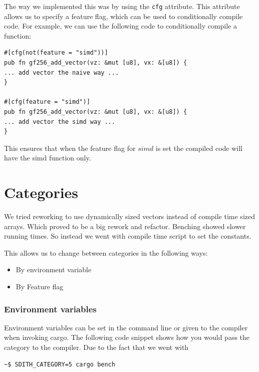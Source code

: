\documentclass[twoside,11pt]{report}
\theoremstyle{definition}
\theoremstyle{plain}
\begin{document}
The way we implemented this was by using the \texttt{cfg} attribute. This attribute allows us to specify a feature flag, which can be used to conditionally compile code. For example, we can use the following code to conditionally compile a function:
\begin{verbatim}
#[cfg(not(feature = "simd"))]
pub fn gf256_add_vector(vz: &mut [u8], vx: &[u8]) {
... add vector the naive way ...
}

#[cfg(feature = "simd")]
pub fn gf256_add_vector(vz: &mut [u8], vx: &[u8]) {
... add vector the simd way ...
}
\end{verbatim}
This ensures that when the feature flag for $simd$ is set the compiled code will have the simd function only.

\section{Categories}\label{sub:categories} %
We tried reworking to use dynamically sized vectors instead of compile time sized arrays. Which proved to be a big rework and refactor. Benching showed slower running times. So instead we went with compile time script to set the constants.

This allows us to change between categories in the following ways:
\begin{itemize}
  \item By environment variable
  \item By Feature flag
\end{itemize}

\subsubsection{Environment variables}\label{sub:env_vars}
Environment variables can be set in the command line or given to the compiler when invoking cargo. The following code snippet shows how you would pass the category to the compiler. Due to the fact that we went with
\begin{verbatim}
~$ SDITH_CATEGORY=5 cargo bench
\end{verbatim}
\end{document}
